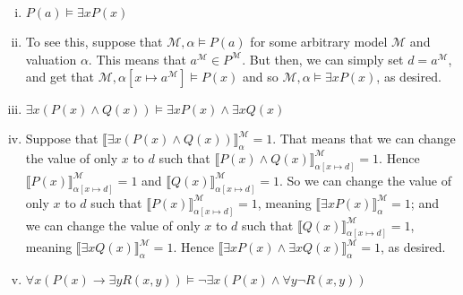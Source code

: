 \begin{enumerate}[\thesection.1]
\begin{enumerate}[(i)]
		\item $P(a)\vDash\exists xP(x)$
		
		\item[] To see this, suppose that $\mathcal{M},\alpha\vDash P(a)$ for some arbitrary model $\mathcal{M}$ and valuation $\alpha$. This means that $a^\mathcal{M}\in P^\mathcal{M}$. But then, we can simply set $d=a^\mathcal{M}$, and get that $\mathcal{M},\alpha[x\mapsto a^\mathcal{M}]\vDash P(x)$ and so $\mathcal{M},\alpha\vDash\exists xP(x)$, as desired.
		
\item $\exists x(P(x)\land Q(x))\vDash \exists xP(x)\land \exists xQ(x)$

		\item[] Suppose that $\llbracket\exists x(P(x)\land Q(x))\rrbracket^\mathcal{M}_\alpha=1$. That means that we can change the value of only $x$ to $d$ such that $\llbracket P(x)\land Q(x)\rrbracket^\mathcal{M}_{\alpha[x\mapsto d]}=1$. Hence $\llbracket P(x)\rrbracket^\mathcal{M}_{\alpha[x\mapsto d]}=1$ and $\llbracket Q(x)\rrbracket^\mathcal{M}_{\alpha[x\mapsto d]}=1$. So we can change the value of only $x$ to $d$ such that $\llbracket P(x)\rrbracket^\mathcal{M}_{\alpha[x\mapsto d]}=1$, meaning $\llbracket\exists xP(x)\rrbracket^\mathcal{M}_\alpha=1$; and we can change the value of only $x$ to $d$ such that $\llbracket Q(x)\rrbracket^\mathcal{M}_{\alpha[x\mapsto d]}=1$, meaning $\llbracket\exists xQ(x)\rrbracket^\mathcal{M}_\alpha=1$. Hence $\llbracket\exists xP(x)\land \exists xQ(x)\rrbracket^\mathcal{M}_\alpha=1$, as desired.

		\item $\forall x(P(x)\to \exists yR(x,y))\vDash \neg \exists x(P(x)\land \forall y\neg R(x,y))$
		

\end{enumerate}
\end{enumerate}
